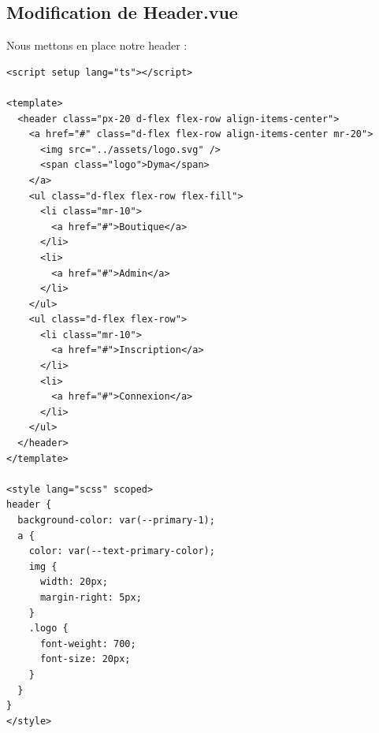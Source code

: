\subsection{Modification de Header.vue}
Nous mettons en place notre header :
\begin{verbatim}
<script setup lang="ts"></script>

<template>
  <header class="px-20 d-flex flex-row align-items-center">
    <a href="#" class="d-flex flex-row align-items-center mr-20">
      <img src="../assets/logo.svg" />
      <span class="logo">Dyma</span>
    </a>
    <ul class="d-flex flex-row flex-fill">
      <li class="mr-10">
        <a href="#">Boutique</a>
      </li>
      <li>
        <a href="#">Admin</a>
      </li>
    </ul>
    <ul class="d-flex flex-row">
      <li class="mr-10">
        <a href="#">Inscription</a>
      </li>
      <li>
        <a href="#">Connexion</a>
      </li>
    </ul>
  </header>
</template>

<style lang="scss" scoped>
header {
  background-color: var(--primary-1);
  a {
    color: var(--text-primary-color);
    img {
      width: 20px;
      margin-right: 5px;
    }
    .logo {
      font-weight: 700;
      font-size: 20px;
    }
  }
}
</style>
\end{verbatim}

